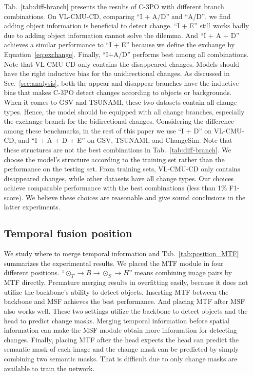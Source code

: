 \documentclass[review]{elsarticle}
\begin{document}
Tab.~\ref{tab:diff-branch} presents the results of C-3PO with different branch combinations. On VL-CMU-CD, comparing ``I + A/D'' and ``A/D'', we find adding object information is beneficial to detect change. ``I + E'' still works badly due to adding object information cannot solve the dilemma. And ``I + A + D'' achieves a similar performance to ``I + E'' because we define the exchange by Equation~\ref{eq:exchange}. Finally, ``I+A/D'' performs best among all combinations. Note that VL-CMU-CD only contains the disappeared changes. Models should have the right inductive bias for the unidirectional changes. As discussed in Sec.~\ref{sec:analysis}, both the appear and disappear branches have the inductive bias that makes C-3PO detect changes according to objects or backgrounds. When it comes to GSV and TSUNAMI, these two datasets contain all change types. Hence, the model should be equipped with all change branches, especially the exchange branch for the bidirectional changes. Considering the difference among these benchmarks, in the rest of this paper we use ``I + D'' on VL-CMU-CD, and ``I + A + D + E'' on GSV, TSUNAMI, and ChangeSim. Note that these structures are not the best combinations in Tab.~\ref{tab:diff-branch}. We choose the model's structure according to the training set rather than the performance on the testing set. From training sets, VL-CMU-CD only contains disappeared changes, while other datasets have all change types. Our choices achieve comparable performance with the best combinations (less than 1\% F1-score). We believe these choices are reasonable and give sound conclusions in the latter experiments.


\subsection{Temporal fusion position}

We study where to merge temporal information and Tab.~\ref{tab:position_MTF} summarizes the experimental results. We placed the MTF module in four different positions. ``$\odot_{T} \rightarrow B \rightarrow \odot_{S} \rightarrow H$'' means combining image pairs by MTF directly. Premature merging results in overfitting easily, because it does not utilize the backbone's ability to detect objects. Inserting MTF between the backbone and MSF achieves the best performance. And placing MTF after MSF also works well. These two settings utilize the backbone to detect objects and the head to predict change masks. Merging temporal information before spatial information can make the MSF module obtain more information for detecting changes. Finally, placing MTF after the head expects the head can predict the semantic mask of each image and the change mask can be predicted by simply combining two semantic masks. That is difficult due to only change masks are available to train the network.
\end{document}
